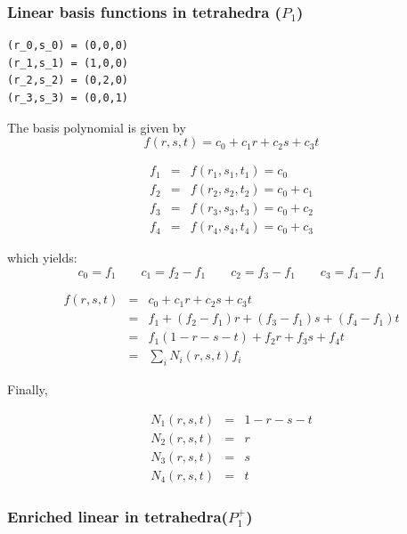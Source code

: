 

\subsubsection{Linear basis functions in tetrahedra ($P_1$)}


\begin{verbatim}
(r_0,s_0) = (0,0,0)
(r_1,s_1) = (1,0,0)
(r_2,s_2) = (0,2,0)
(r_3,s_3) = (0,0,1)
\end{verbatim}

The basis polynomial is given by
\[
f(r,s,t)=c_0 + c_1 r + c_2 s + c_3 t
\]

\begin{eqnarray}
f_1 &=& f(r_1,s_1,t_1) = c_0 \\
f_2 &=& f(r_2,s_2,t_2) = c_0 + c_1\\
f_3 &=& f(r_3,s_3,t_3) = c_0 + c_2\\
f_4 &=& f(r_4,s_4,t_4) = c_0 + c_3
\end{eqnarray}

which yields:
\[
c_0=f_1
\quad
\quad
c_1=f_2-f_1
\quad
\quad
c_2=f_3-f_1
\quad
\quad
c_3=f_4-f_1
\]

\begin{eqnarray}
f(r,s,t) 
&=& c_0 + c_1 r + c_2 s + c_3 t \nonumber\\
&=& f_1 + (f_2-f_1) r + (f_3-f_1) s + (f_4-f_1) t \nonumber\\
&=& f_1 (1-r-s-t) + f_2 r + f_3 s + f_4 t \nonumber\\
&=& \sum_i N_i(r,s,t) f_i \nonumber
\end{eqnarray}

Finally,

\begin{mdframed}[backgroundcolor=blue!5]
\begin{eqnarray}
N_1(r,s,t) &=& 1-r-s-t \nonumber\\
N_2(r,s,t) &=& r \nonumber\\
N_3(r,s,t) &=& s \nonumber\\
N_4(r,s,t) &=& t \nonumber
\end{eqnarray}
\end{mdframed}

\subsubsection{Enriched linear in tetrahedra($P_1^+$)}

